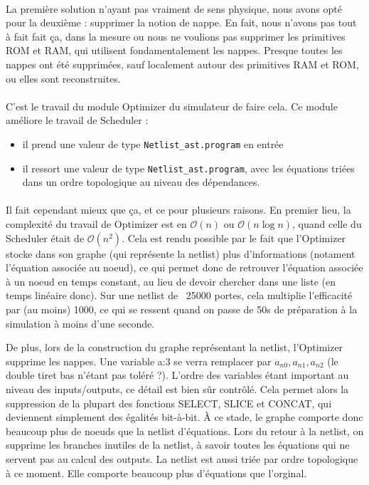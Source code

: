 \documentclass{article}
\begin{document}
\paragraph{}La première solution n'ayant pas vraiment de sens physique, nous avons opté pour la deuxième : supprimer la notion de nappe.
En  fait, nous n'avons pas tout à fait fait ça, dans la mesure ou nous ne  voulions pas supprimer les primitives ROM et RAM, qui utilisent  fondamentalement les nappes.
Presque toutes les nappes ont été supprimées, sauf localement autour des primitives RAM et ROM, ou elles sont reconstruites.

\paragraph{}C'est le travail du module Optimizer du simulateur de faire cela. Ce module améliore le travail de Scheduler :
\begin{itemize}
	\item il prend une valeur de type \texttt{Netlist\_ast.program} en entrée
	\item il ressort une valeur de type \texttt{Netlist\_ast.program}, avec les équations  triées dans un ordre topologique au niveau des dépendances.
\end{itemize}

\paragraph{}Il fait cependant mieux que ça, et ce pour plusieurs raisons.
En premier lieu, la complexité du travail de Optimizer est  en $\mathcal O(n)$ ou $\mathcal O(n\log n)$, quand celle du Scheduler était de $\mathcal O(n^2)$. Cela  est rendu possible par le fait que l'Optimizer stocke dans son graphe  (qui représente la netlist) plus d'informations (notament l'équation  associée au noeud), ce qui permet donc de retrouver l'équation associée à  un noeud en temps constant, au lieu de devoir chercher dans une liste  (en temps linéaire donc). Sur une netlist de ~25000 portes, cela  multiplie l'efficacité par (au moins) 1000, ce qui se ressent quand on  passe de 50s de préparation à la simulation à moins d'une seconde.

De plus, lors de la construction du graphe représentant la netlist,  l'Optimizer supprime les nappes. Une variable a:3 se verra remplacer par $a_{n0}, a_{n1}, a_{n2}$ (le double tiret bas n'étant pas toléré ?). L'ordre  des variables étant important au niveau des inputs/outputs, ce détail  est bien sûr  contrôlé. Cela permet alors la suppression de la plupart des fonctions  SELECT, SLICE et CONCAT, qui deviennent simplement des égalités  bit-à-bit. À ce stade, le graphe comporte donc beaucoup plus de noeuds  que la netlist d'équations.
Lors  du retour à la netlist, on supprime les branches inutiles de la  netlist, à savoir toutes les équations qui ne servent pas au calcul des  outputs. La netlist est aussi triée par ordre topologique à ce moment.  Elle comporte beaucoup plus d'équations que l'orginal.
\end{document}
